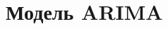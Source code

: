 \documentclass[12pt]{article}
\theoremstyle{remark}
\newtheorem{exercise}{}[subsection]
\begin{document}


\section{Модель ARIMA}

\end{document}

